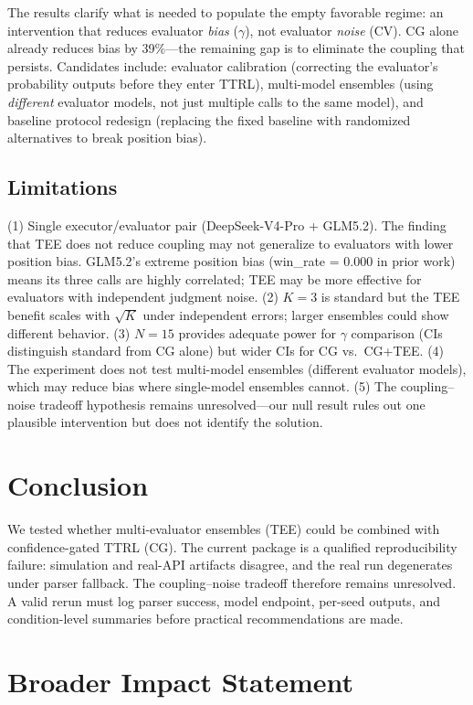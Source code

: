 \documentclass[11pt]{article}
\begin{document}
The results clarify what is needed to populate the empty favorable regime: an intervention that reduces evaluator \textit{bias} ($\gamma$), not evaluator \textit{noise} (CV). CG alone already reduces bias by 39\%---the remaining gap is to eliminate the coupling that persists. Candidates include: evaluator calibration (correcting the evaluator's probability outputs before they enter TTRL), multi-model ensembles (using \textit{different} evaluator models, not just multiple calls to the same model), and baseline protocol redesign (replacing the fixed baseline with randomized alternatives to break position bias).

\subsection{Limitations}

(1) Single executor/evaluator pair (DeepSeek-V4-Pro + GLM5.2). The finding that TEE does not reduce coupling may not generalize to evaluators with lower position bias. GLM5.2's extreme position bias (win\_rate = 0.000 in prior work) means its three calls are highly correlated; TEE may be more effective for evaluators with independent judgment noise. (2) $K{=}3$ is standard but the TEE benefit scales with $\sqrt{K}$ under independent errors; larger ensembles could show different behavior. (3) $N{=}15$ provides adequate power for $\gamma$ comparison (CIs distinguish standard from CG alone) but wider CIs for CG vs.\ CG+TEE. (4) The experiment does not test multi-model ensembles (different evaluator models), which may reduce bias where single-model ensembles cannot. (5) The coupling--noise tradeoff hypothesis remains unresolved---our null result rules out one plausible intervention but does not identify the solution.

\section{Conclusion}

We tested whether multi-evaluator ensembles (TEE) could be combined with confidence-gated TTRL (CG). The current package is a qualified reproducibility failure: simulation and real-API artifacts disagree, and the real run degenerates under parser fallback. The coupling--noise tradeoff therefore remains unresolved. A valid rerun must log parser success, model endpoint, per-seed outputs, and condition-level summaries before practical recommendations are made.

\section*{Broader Impact Statement}
\end{document}
